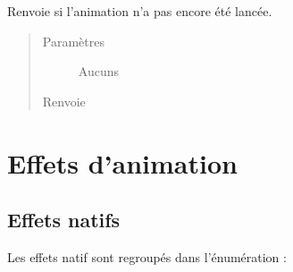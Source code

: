 \documentclass[letterpaper,10pt,french]{sphinxmanual}
\begin{document}
\begin{fulllineitems}
\begin{fulllineitems}
\end{fulllineitems}


\begin{fulllineitems}
\label{\detokenize{animation:pygame_animations.Animation.can_run}}
\sphinxAtStartPar
Renvoie  si l’animation n’a pas encore été lancée.
\begin{quote}\begin{description}
\item[{Paramètres}] \leavevmode
\sphinxAtStartPar
Aucuns

\item[{Renvoie}] \leavevmode
\sphinxAtStartPar
{}

\end{description}\end{quote}

\end{fulllineitems}


\end{fulllineitems}



\chapter{Effets d’animation}
\label{\detokenize{effects:effets-d-animation}}\label{\detokenize{effects::doc}}

\section{Effets natifs}
\label{\detokenize{effects:effets-natifs}}\label{\detokenize{effects:nativeeffects}}
\sphinxAtStartPar
Les effets natif sont regroupés dans l’énumération :
\end{document}
